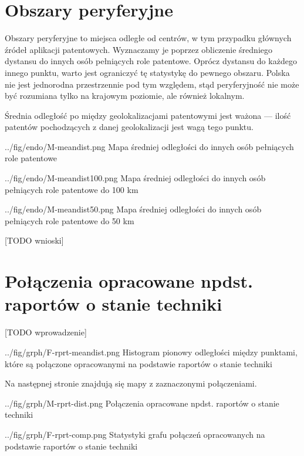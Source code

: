     \newpage\section
  {Obszary peryferyjne}

Obszary peryferyjne to miejsca odległe od centrów, w tym przypadku
głównych źródeł aplikacji patentowych. Wyznaczamy je poprzez obliczenie
średniego dystansu do innych osób pełniących role patentowe.
Oprócz dystansu do każdego innego punktu, warto jest ograniczyć
tę statystykę do pewnego obszaru. Polska nie jest jednorodna przestrzennie 
pod tym względem, stąd peryferyjność nie może być rozumiana tylko 
na krajowym poziomie, ale również lokalnym.

\begin{uwaga}
Średnia odległość po między geolokalizacjami patentowymi jest ważona ---
ilość patentów pochodzących z danej geolokalizacji jest wagą tego punktu.
\end{uwaga}

  \fig
{../fig/endo/M-meandist.png}
{ Mapa średniej odległości do innych osób pełniących role patentowe }

  \fig
{../fig/endo/M-meandist100.png}
{ Mapa średniej odległości do innych osób pełniących role patentowe do 100 km }

  \fig
{../fig/endo/M-meandist50.png}
{ Mapa średniej odległości do innych osób pełniących role patentowe do 50 km }


[TODO wnioski]




    \newpage\section
  {Połączenia opracowane npdst. raportów o stanie techniki}

[TODO wprowadzenie]

  \figside
{../fig/grph/F-rprt-meandist.png}
{ Histogram pionowy odległości między punktami, które są 
  połączone opracowanymi na podstawie raportów o stanie techniki }

Na następnej stronie znajdują się mapy z zaznaczonymi połączeniami.

\newpage

  \chart
{../fig/grph/M-rprt-dist.png}
{ Połączenia opracowane npdst. raportów o stanie techniki }\newpage

  \chartside
{../fig/grph/F-rprt-comp.png}
{ Statystyki grafu połączeń opracowanych na podstawie raportów o stanie techniki }



